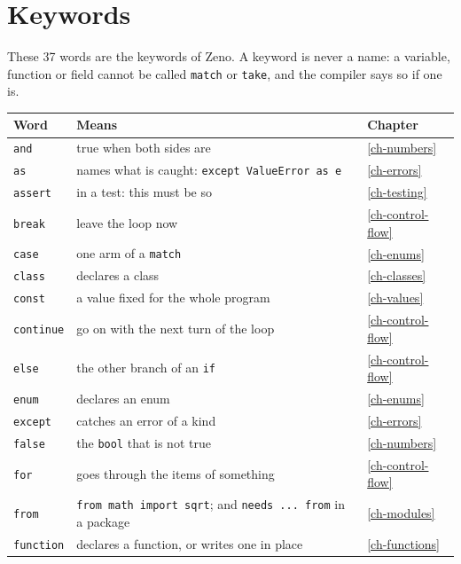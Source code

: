 \chapter{Keywords}\label{app-keywords}

These 37 words are the keywords of Zeno. A keyword is never a name: a
variable, function or field cannot be called \verb|match| or
\verb|take|, and the compiler says so if one is.

\begin{center}
\begin{longtable}{lP{8.2cm}l}
\toprule
Word & Means & Chapter \\
\midrule
\endhead
\verb|and| & true when both sides are & \hyperref[ch-numbers]{\ref*{ch-numbers}} \\
\verb|as| & names what is caught: \verb|except ValueError as e| & \hyperref[ch-errors]{\ref*{ch-errors}} \\
\verb|assert| & in a test: this must be so & \hyperref[ch-testing]{\ref*{ch-testing}} \\
\verb|break| & leave the loop now & \hyperref[ch-control-flow]{\ref*{ch-control-flow}} \\
\verb|case| & one arm of a \verb|match| & \hyperref[ch-enums]{\ref*{ch-enums}} \\
\verb|class| & declares a class & \hyperref[ch-classes]{\ref*{ch-classes}} \\
\verb|const| & a value fixed for the whole program & \hyperref[ch-values]{\ref*{ch-values}} \\
\verb|continue| & go on with the next turn of the loop & \hyperref[ch-control-flow]{\ref*{ch-control-flow}} \\
\verb|else| & the other branch of an \verb|if| & \hyperref[ch-control-flow]{\ref*{ch-control-flow}} \\
\verb|enum| & declares an enum & \hyperref[ch-enums]{\ref*{ch-enums}} \\
\verb|except| & catches an error of a kind & \hyperref[ch-errors]{\ref*{ch-errors}} \\
\verb|false| & the \verb|bool| that is not true & \hyperref[ch-numbers]{\ref*{ch-numbers}} \\
\verb|for| & goes through the items of something & \hyperref[ch-control-flow]{\ref*{ch-control-flow}} \\
\verb|from| & \verb|from math import sqrt|; and \verb|needs ... from| in a package & \hyperref[ch-modules]{\ref*{ch-modules}} \\
\verb|function| & declares a function, or writes one in place & \hyperref[ch-functions]{\ref*{ch-functions}} \\

\end{longtable}
\end{center}
